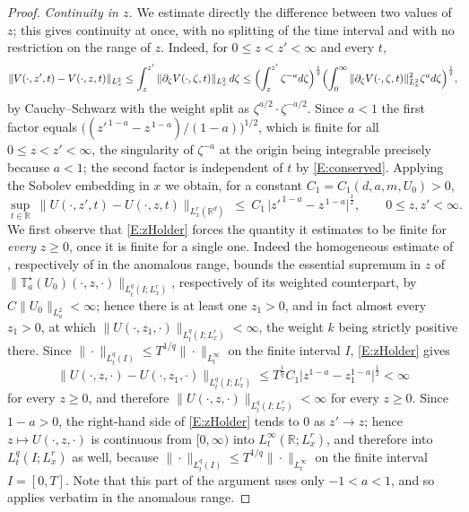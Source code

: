 \documentclass[11pt,letter]{amsart}
\def \R {\mathbb{R}}
\newcommand{\Rd}{\mathbb R^d}
\newcommand{\p}{\partial}
\numberwithin{equation}{section}
\numberwithin{equation}{section}
\begin{document}
\begin{proof}
\smallskip
\noindent\emph{Continuity in $z$.} We estimate directly the difference between
two values of $z$; this gives continuity at once, with no splitting of the time
interval and with no restriction on the range of $z$.
Indeed, for $0\le z<z'<\infty$ and every $t$,
\[
\|V(\cdot,z',t)-V(\cdot,z,t)\|_{L^2_x}
\le\int_z^{z'}\|\p_\zeta V(\cdot,\zeta,t)\|_{L^2_x}\,d\zeta
\le\Bigl(\int_z^{z'}\zeta^{-a}d\zeta\Bigr)^{\frac12}
\Bigl(\int_0^\infty\|\p_\zeta V(\cdot,\zeta,t)\|_{L^2_x}^2\zeta^ad\zeta\Bigr)^{\frac12},
\]
by Cauchy--Schwarz with the weight split as $\zeta^{a/2}\cdot\zeta^{-a/2}$.
Since $a<1$ the first factor equals
$\bigl((z'^{\,1-a}-z^{\,1-a})/(1-a)\bigr)^{1/2}$, which is finite for all
$0\le z<z'<\infty$, the singularity of $\zeta^{-a}$ at the origin being
integrable precisely because $a<1$; the second factor is
independent of $t$ by \eqref{E:conserved}. Applying the Sobolev embedding in
$x$ we obtain, for a constant $C_1=C_1(d,a,m,U_0)>0$,
\begin{equation}\label{E:zHolder}
\sup_{t\in\R}\ \|U(\cdot,z',t)-U(\cdot,z,t)\|_{L^r_x(\Rd)}
\ \le\ C_1\,\bigl|z'^{\,1-a}-z^{\,1-a}\bigr|^{\frac12},
\qquad 0\le z,z'<\infty .
\end{equation}
We first observe that \eqref{E:zHolder} forces the quantity it estimates to be
finite for \emph{every} $z\ge0$, once it is finite for a single one. Indeed the
homogeneous estimate of \cite[Theorem~2.4]{GS2}, respectively of
\cite[Theorem~2.5]{GS2} in the anomalous range, bounds the essential supremum
in $z$ of $\|\mathbb T^\star_a(U_0)(\cdot,z,\cdot)\|_{L^q_t(I;L^r_x)}$,
respectively of its weighted counterpart, by $C\|U_0\|_{L^2_a}<\infty$; hence
there is at least one $z_1>0$, and in fact almost every $z_1>0$, at which
$\|U(\cdot,z_1,\cdot)\|_{L^q_t(I;L^r_x)}<\infty$, the weight $k$ being strictly
positive there. Since $\|\cdot\|_{L^q_t(I)}\le T^{1/q}\|\cdot\|_{L^\infty_t}$ on
the finite interval $I$, \eqref{E:zHolder} gives
\[
\|U(\cdot,z,\cdot)-U(\cdot,z_1,\cdot)\|_{L^q_t(I;L^r_x)}
\le T^{\frac1q}C_1\bigl|z^{1-a}-z_1^{1-a}\bigr|^{\frac12}<\infty
\]
for every $z\ge0$, and therefore
$\|U(\cdot,z,\cdot)\|_{L^q_t(I;L^r_x)}<\infty$ for every $z\ge0$.
Since $1-a>0$, the right-hand side of \eqref{E:zHolder} tends to $0$ as
$z'\to z$; hence
$z\mapsto U(\cdot,z,\cdot)$ is continuous from $[0,\infty)$ into
$L^\infty_t(\R;L^r_x)$, and therefore into $L^q_t(I;L^r_x)$ as well, because
$\|\cdot\|_{L^q_t(I)}\le T^{1/q}\|\cdot\|_{L^\infty_t}$ on the finite interval
$I=[0,T]$. Note that this part of the argument uses only $-1<a<1$, and so
applies verbatim in the anomalous range.


\end{proof}
\end{document}
